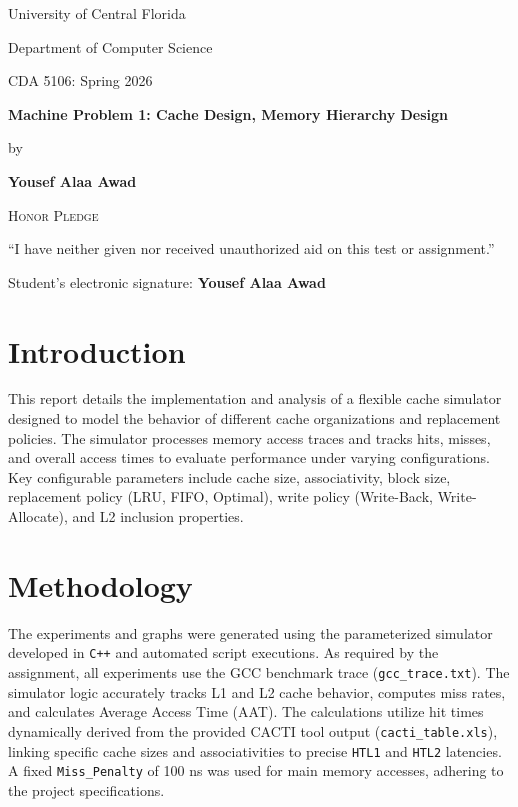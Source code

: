 \documentclass[12pt]{article}
\begin{document}
\begin{titlepage}
    \centering
    \vspace*{2cm}
    {\Large University of Central Florida \par}
    {\Large Department of Computer Science \par}
    {\Large CDA 5106: Spring 2026 \par}
    \vspace{2cm}
    {\huge\bfseries Machine Problem 1: Cache Design, Memory Hierarchy Design\par}
    \vspace{2cm}
    {\Large by\par}
    \vspace{1cm}
    {\Large \textbf{Yousef Alaa Awad} \par}
    \vfill
    {\scshape\Large Honor Pledge\par}
    \vspace{0.5cm}
    {\large ``I have neither given nor received unauthorized aid on this test or assignment.''\par}
    \vspace{1cm}
    {\large Student's electronic signature: \textbf{Yousef Alaa Awad}\par}
    \vspace{2cm}
\end{titlepage}

\section{Introduction}
This report details the implementation and analysis of a flexible cache simulator designed to model the behavior of different cache organizations and replacement policies. The simulator processes memory access traces and tracks hits, misses, and overall access times to evaluate performance under varying configurations. Key configurable parameters include cache size, associativity, block size, replacement policy (LRU, FIFO, Optimal), write policy (Write-Back, Write-Allocate), and L2 inclusion properties.

\section{Methodology}
The experiments and graphs were generated using the parameterized simulator developed in \texttt{C++} and automated script executions. As required by the assignment, all experiments use the GCC benchmark trace (\texttt{gcc\_trace.txt}). The simulator logic accurately tracks L1 and L2 cache behavior, computes miss rates, and calculates Average Access Time (AAT). The calculations utilize hit times dynamically derived from the provided CACTI tool output (\texttt{cacti\_table.xls}), linking specific cache sizes and associativities to precise \texttt{HTL1} and \texttt{HTL2} latencies. A fixed \texttt{Miss\_Penalty} of 100 ns was used for main memory accesses, adhering to the project specifications.
\end{document}
